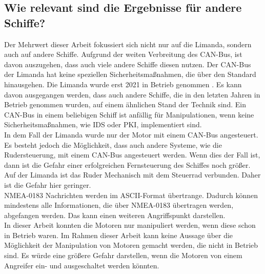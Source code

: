 \subsection{Wie relevant sind die Ergebnisse für andere Schiffe?}
Der Mehrwert dieser Arbeit fokussiert sich nicht nur auf die Limanda, sondern auch auf andere Schiffe.
Aufgrund der weiten Verbreitung des CAN-Bus, ist davon auszugehen, dass auch viele andere Schiffe diesen nutzen.
Der CAN-Bus der Limanda hat keine speziellen Sicherheitsmaßnahmen, die über den Standard hinausgehen. 
Die Limanda wurde erst 2021 in Betrieb genommen \cite{limanda}.
Es kann davon ausgegangen werden, dass auch andere Schiffe, die in den letzten Jahren in Betrieb genommen wurden, auf einem
ähnlichen Stand der Technik sind. Ein CAN-Bus in einem beliebigen Schiff ist anfällig für Manipulationen, wenn keine
Sicherheitsmaßnahmen, wie IDS oder PKI, implementiert sind. \\
In dem Fall der Limanda wurde nur der Motor mit einem CAN-Bus angesteuert. Es besteht jedoch die Möglichkeit, dass auch 
andere Systeme, wie die Rudersteuerung, mit einem CAN-Bus angesteuert werden. Wenn dies der Fall ist, dann 
ist die Gefahr einer erfolgreichen Fernsteuerung des Schiffes noch größer. Auf der Limanda ist das Ruder Mechanisch
mit dem Steuerrad verbunden. Daher ist die Gefahr hier geringer.
\\
NMEA-0183 Nachrichten werden im ASCII-Format übertrange. Dadurch können mindestens 
alle Informationen, die über NMEA-0183 übertragen werden, abgefangen werden. Das kann einen weiteren Angriffspunkt darstellen. \\
In dieser Arbeit konnten die Motoren nur manipuliert werden, wenn diese schon in Betrieb waren. 
Im Rahmen dieser Arbeit kann keine Aussage über 
die Möglichkeit der Manipulation von Motoren gemacht werden, die nicht in Betrieb sind. Es würde eine größere Gefahr
darstellen, wenn die Motoren von einem Angreifer ein- und ausgeschaltet werden könnten. \\

